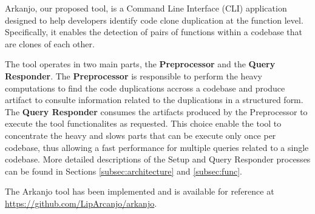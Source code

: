 \en

Arkanjo, our proposed tool, is a Command Line Interface (CLI) application designed to
help developers identify code clone duplication at the function level.
Specifically, it enables the detection of pairs of functions within a codebase
that are clones of each other.

The tool operates in two main parts, the \textbf{Preprocessor} and the \textbf{Query Responder}. 
The \textbf{Preprocessor} is responsible to perform the heavy computations to find the code duplications 
accross a codebase and produce artifact to consulte information related to the duplications in a structured form.
The \textbf{Query Responder} consumes the artifacts produced by the Preprocessor to execute the tool functionalites as requested.
This choice enable the tool to concentrate the heavy and slows parts that can be execute only once per codebase, 
thus allowing a fast performance for multiple queries related to a single codebase.
More detailed descriptions of the Setup and Query Responder processes can be found in
Sections \ref{subsec:architecture} and \ref{subsec:func}.

The Arkanjo tool has been implemented and is available for reference at
\url{https://github.com/LipArcanjo/arkanjo}.





